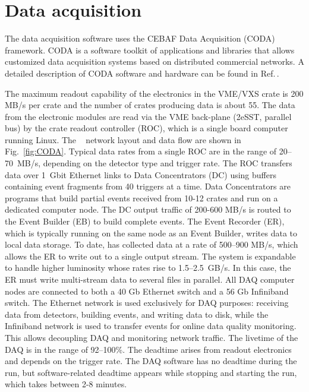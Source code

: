 
\section[Data Acquisition]{Data acquisition \label{sec:daq}}



The \gx{} data acquisition software uses the CEBAF Data Acquisition (CODA) framework. CODA is a software toolkit of applications and libraries that allows customized data acquisition systems based on distributed commercial networks. A detailed description of CODA software and hardware can be found in Ref.\,\cite{CLAS12DAQ}. 

The maximum readout capability of the electronics in the VME/VXS crate is 200 MB/s per crate and the number of crates producing data is about 55.
The data from the electronic modules are read via the VME back-plane (2eSST, parallel bus) by the crate readout controller (ROC), which is a single board computer running Linux.
The \gx~ network layout and data flow are shown in Fig.~\ref{fig:CODA}.
Typical data rates from a single ROC are in the range of 20--70~MB/s, depending on the detector type and trigger rate.
The ROC transfers data over 1~Gbit Ethernet links to Data Concentrators (DC) using buffers containing event fragments from 40 triggers at a time. Data Concentrators are programs that build partial events received from 10-12 crates and run on a dedicated computer node.
The DC output traffic of 200-600 MB/s is routed to the Event Builder (EB) to build complete events.
The Event Recorder (ER), which is typically running on the same node as an Event Builder, writes data to local data storage.
To date, \gx{} has collected data at a rate of 500--900 MB/s, which allows the ER to write out to a single output stream. The system is expandable to handle higher luminosity whose rates rise to 1.5--2.5~GB/s. In this case, the ER must write multi-stream data to several files in parallel.
All DAQ computer nodes are connected to both a 40 Gb Ethernet switch and a 56 Gb Infiniband switch.
The Ethernet network is used exclusively for DAQ purposes: receiving data from detectors, building events, and writing data to disk, 
while the Infiniband network is used to transfer events for online data quality monitoring. 
This allows decoupling DAQ and monitoring network traffic.
The livetime of the DAQ is in the range of 92--100\%. The deadtime arises from readout electronics and depends on the trigger rate.  
The DAQ software has no deadtime during the run, but software-related deadtime appears while stopping and starting the run, which takes between 2-8 minutes. 



